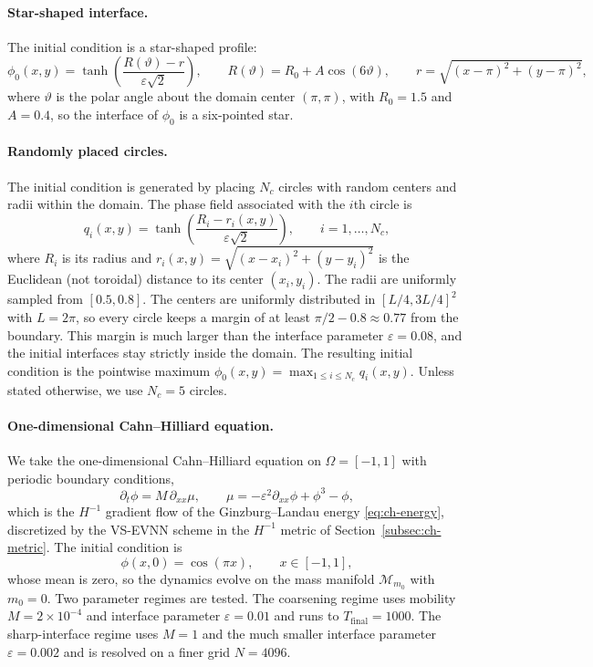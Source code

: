 \documentclass[11pt,letterpaper]{article}
\theoremstyle{plain}
\theoremstyle{definition}
\begin{document}
\paragraph{Star-shaped interface.} The initial condition is a star-shaped profile:
\begin{equation}
\phi_0(x,y)
=
\tanh
\left(
\frac{R(\vartheta)-r}{\varepsilon\sqrt{2}}
\right),
\qquad
R(\vartheta)=R_0+A\cos(6\vartheta),
\qquad
r=\sqrt{(x-\pi)^2+(y-\pi)^2},
\end{equation}
where $\vartheta$ is the polar angle about the domain center $(\pi,\pi)$, with $R_0=1.5$ and $A=0.4$, so the interface of $\phi_0$ is a six-pointed star.

\paragraph{Randomly placed circles.} The initial condition is generated by placing $N_c$ circles with random centers and radii within the domain. The phase field associated with the $i$th circle is
\begin{equation}
q_i(x,y) = \tanh\!\left( \frac{R_i - r_i(x,y)}{\varepsilon\sqrt{2}} \right),
\qquad i=1,\ldots,N_c,
\end{equation}
where $R_i$ is its radius and $r_i(x,y)=\sqrt{(x-x_i)^2+(y-y_i)^2}$ is the Euclidean (not toroidal) distance to its center $(x_i,y_i)$. The radii are uniformly sampled from $[0.5, 0.8]$. The centers are uniformly distributed in $[L/4, 3L/4]^2$ with $L=2\pi$, so every circle keeps a margin of at least $\pi/2 - 0.8 \approx 0.77$ from the boundary. This margin is much larger than the interface parameter $\varepsilon=0.08$, and the initial interfaces stay strictly inside the domain. The resulting initial condition is the pointwise maximum $\phi_0(x,y)=\max_{1\le i\le N_c} q_i(x,y)$. Unless stated otherwise, we use $N_c = 5$ circles.


\paragraph{One-dimensional Cahn--Hilliard equation.} We take the one-dimensional Cahn--Hilliard equation on $\Omega=[-1,1]$ with periodic boundary conditions,
\begin{equation}
\partial_t\phi = M\,\partial_{xx}\mu,
\qquad
\mu = -\varepsilon^2\partial_{xx}\phi + \phi^3 - \phi,
\end{equation}
which is the $H^{-1}$ gradient flow of the Ginzburg--Landau energy \eqref{eq:ch-energy}, discretized by the VS-EVNN scheme in the $H^{-1}$ metric of Section~\ref{subsec:ch-metric}. The initial condition is
\begin{equation}
\phi(x,0)=\cos(\pi x), \qquad x\in[-1,1],
\end{equation}
whose mean is zero, so the dynamics evolve on the mass manifold $\mathcal{M}_{m_0}$ with $m_0=0$. Two parameter regimes are tested. The coarsening regime uses mobility $M=2\times10^{-4}$ and interface parameter $\varepsilon=0.01$ and runs to $T_{\text{final}}=1000$. The sharp-interface regime uses $M=1$ and the much smaller interface parameter $\varepsilon=0.002$ and is resolved on a finer grid $N=4096$.
\end{document}
